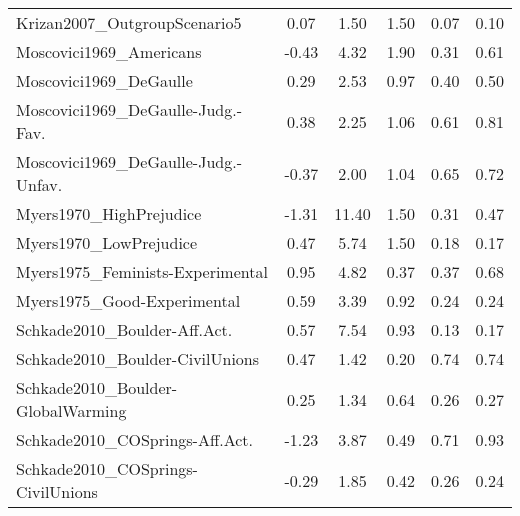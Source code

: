 \begin{longtable}{lccccc}
Krizan2007\_OutgroupScenario5 & 0.07 & 1.50 & 1.50 & 0.07 & 0.10\\
Moscovici1969\_Americans & -0.43 & 4.32 & 1.90 & 0.31 & 0.61\\
Moscovici1969\_DeGaulle & 0.29 & 2.53 & 0.97 & 0.40 & 0.50\\
Moscovici1969\_DeGaulle-Judg.-Fav. & 0.38 & 2.25 & 1.06 & 0.61 & 0.81\\
\addlinespace
Moscovici1969\_DeGaulle-Judg.-Unfav. & -0.37 & 2.00 & 1.04 & 0.65 & 0.72\\
Myers1970\_HighPrejudice & -1.31 & 11.40 & 1.50 & 0.31 & 0.47\\
Myers1970\_LowPrejudice & 0.47 & 5.74 & 1.50 & 0.18 & 0.17\\
Myers1975\_Feminists-Experimental & 0.95 & 4.82 & 0.37 & 0.37 & 0.68\\
Myers1975\_Good-Experimental & 0.59 & 3.39 & 0.92 & 0.24 & 0.24\\
\addlinespace
Schkade2010\_Boulder-Aff.Act. & 0.57 & 7.54 & 0.93 & 0.13 & 0.17\\
Schkade2010\_Boulder-CivilUnions & 0.47 & 1.42 & 0.20 & 0.74 & 0.74\\
Schkade2010\_Boulder-GlobalWarming & 0.25 & 1.34 & 0.64 & 0.26 & 0.27\\
Schkade2010\_COSprings-Aff.Act. & -1.23 & 3.87 & 0.49 & 0.71 & 0.93\\
Schkade2010\_COSprings-CivilUnions & -0.29 & 1.85 & 0.42 & 0.26 & 0.24\\*
\end{longtable}
